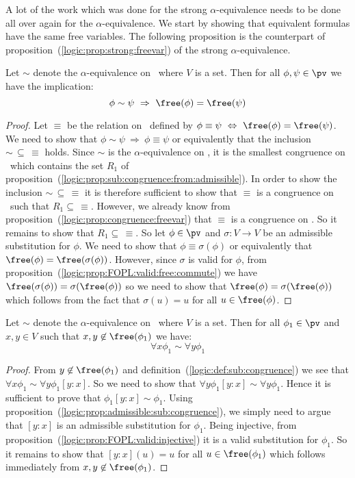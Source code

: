 A lot of the work which was done for the strong $\alpha$-equivalence
needs to be done all over again for the $\alpha$-equivalence. 
We start by showing that equivalent formulas have the
same free variables. The following proposition is the counterpart of
proposition~(\ref{logic:prop:strong:freevar}) of the strong 
$\alpha$-equivalence.

\begin{prop}\label{logic:prop:sub:congruence:freevar}
Let $\sim$ denote the $\alpha$-equivalence on \pv\ where $V$ is a
set. Then for all $\phi,\psi\in\pv$ we have the implication:
    \[
    \phi\sim\psi\ \Rightarrow\ \free(\phi)=\free(\psi)
    \]
\end{prop}

\noindent
\begin{proof}
Let $\equiv$ be the relation on \pv\ defined by $\phi\equiv\psi\
\Leftrightarrow\ \free(\phi)=\free(\psi)$. We need to show that
$\phi\sim\psi\ \Rightarrow\ \phi\equiv\psi$ or equivalently that the
inclusion $\sim\,\subseteq\,\equiv$ holds. Since $\sim$ is the
$\alpha$-equivalence on \pv, it is the smallest congruence on
\pv\ which contains the set $R_{1}$ of
proposition~(\ref{logic:prop:sub:congruence:from:admissible}). In
order to show the inclusion $\sim\,\subseteq\,\equiv$ it is
therefore sufficient to show that $\equiv$ is a congruence on \pv\
such that $R_{1}\subseteq\,\equiv$. However, we already know from
proposition~(\ref{logic:prop:congruence:freevar}) that $\equiv$ is a
congruence on \pv. So it remains to show that
$R_{1}\subseteq\,\equiv$. So let $\phi\in\pv$ and $\sigma:V\to V$ be
an admissible substitution for $\phi$. We need to show that
$\phi\equiv\sigma(\phi)$ or equivalently that
$\free(\phi)=\free(\sigma(\phi))$. However, since $\sigma$ is valid
for $\phi$, from
proposition~(\ref{logic:prop:FOPL:valid:free:commute}) we have
$\free(\sigma(\phi))=\sigma(\free(\phi))$ so we need to show that
$\free(\phi)=\sigma(\free(\phi))$ which follows from the fact that
$\sigma(u)=u$ for all $u\in\free(\phi)$.
\end{proof}

\begin{prop}\label{logic:prop:FOPL:freesubcong:xy:not:free}
Let $\sim$ denote the $\alpha$-equivalence on \pv\ where $V$ is a
set. Then for all $\phi_{1}\in\pv$ and $x,y\in V$ such that
$x,y\not\in\free(\phi_{1})$ we have:
    \[
    \forall x\phi_{1}\sim\forall y\phi_{1}
    \]
\end{prop}

\noindent
\begin{proof}
From $y\not\in\free(\phi_{1})$ and
definition~(\ref{logic:def:sub:congruence}) we see that $\forall
x\phi_{1}\sim\forall y\phi_{1}[y\!:\!x]$. So we need to show that
$\forall y\phi_{1}[y\!:\!x]\sim\forall y\phi_{1}$. Hence it is
sufficient to prove that $\phi_{1}[y\!:\!x]\sim\phi_{1}$. Using
proposition~(\ref{logic:prop:admissible:sub:congruence}), we simply
need to argue that $[y\!:\!x]$ is an admissible substitution for
$\phi_{1}$. Being injective, from
proposition~(\ref{logic:prop:FOPL:valid:injective}) it is a valid
substitution for $\phi_{1}$. So it remains to show that
$[y\!:\!x](u)=u$ for all $u\in\free(\phi_{1})$ which follows
immediately from $x,y\not\in\free(\phi_{1})$.
\end{proof}
